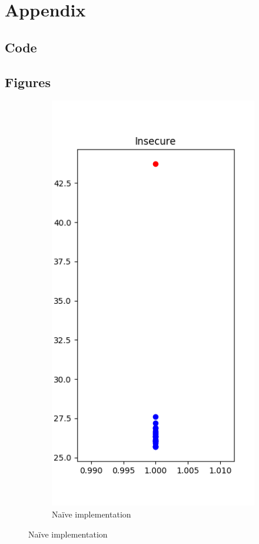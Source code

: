 \section{Appendix}

\subsection{Code}

\subsection{Figures}

\begin{figure}[h]
\centering
\begin{subfigure}{.5\textwidth}
  \centering
  \includegraphics[width=.7\linewidth]{figures/insecure0.png}
  \caption{Na\"ive implementation}
  \label{fig:sub1}
\end{subfigure}%

\end{figure}
